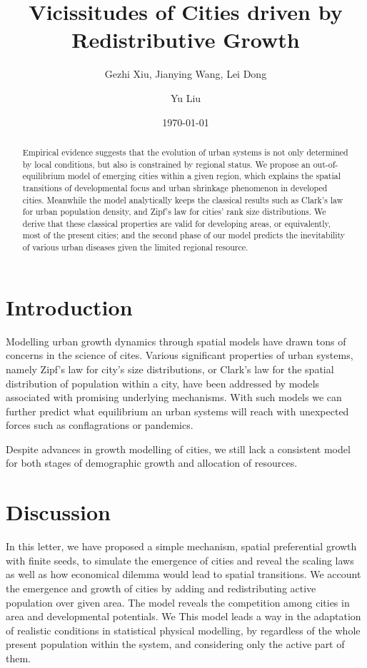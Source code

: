 \documentclass[reprint,unsortedaddress,amsmath,amssymb,aps,prl,showkeys]{revtex4-2}
\begin{document}
\title{Vicissitudes of Cities driven by Redistributive Growth}
\author{Gezhi Xiu, Jianying Wang, Lei Dong}
\author{Yu Liu}
\date{\today}

\begin{abstract}
    Empirical evidence suggests that the evolution of urban systems is not only determined by local conditions, but also is constrained by regional status. We propose an out-of-equilibrium model of emerging cities within a given region, which explains the spatial transitions of developmental focus and urban shrinkage phenomenon in developed cities. Meanwhile the model analytically keeps the classical results such as Clark's law for urban population density, and Zipf's law for cities' rank size distributions. We derive that these classical properties are valid for developing areas, or equivalently, most of the present cities; and the second phase of our model predicts the inevitability of various urban diseases given the limited regional resource. 
\end{abstract}
\maketitle
\section{Introduction}

Modelling urban growth dynamics through spatial models have drawn tons of concerns in the science of cites. Various significant properties of urban systems, namely Zipf's law for city's size distributions, or Clark's law for the spatial distribution of population within a city, have been addressed by models associated with promising underlying mechanisms. With such models we can further predict what equilibrium an urban systems will reach with unexpected forces such as conflagrations or pandemics. 

Despite advances in growth modelling of cities, we still lack a consistent model for both stages of demographic growth and allocation of resources.


\section{Discussion}


In this letter, we have proposed a simple mechanism, spatial preferential growth with finite seeds, to simulate the emergence of cities and reveal the scaling laws as well as how economical dilemma would lead to spatial transitions. We account the emergence and growth of cities by adding and redistributing active population over given area. The model reveals the competition among cities in area and developmental potentials. We 
This model leads a way in the adaptation of realistic conditions in statistical physical modelling, by regardless of the whole present population within the system, and considering only the active part of them. 
\end{document}
